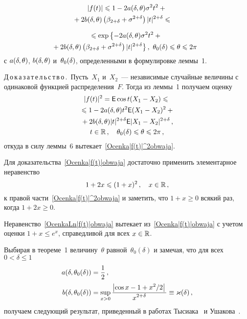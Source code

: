 \begin{multicols}{2}
\vspace*{-8pt}

\noindent
\begin{multline}
|f(t)|\leqslant1 -2a(\delta,\theta)\sigma^2t^2+{}\\
{}+2b(\delta,\theta)\left(\beta_{2+\delta}+
\sigma^{2+\delta}\right)|t|^{2+\delta}\leqslant{}\ \ \ \
\label{Ocenka|f(t)|obwaja}
\end{multline}

\vspace*{-12pt}

\noindent
\begin{multline}
\le \exp\left\{-2a(\d,\theta)\sigma^2t^2+{}\right.\\
\!\!\!\!\!\!\!\!\left.{}+2b(\d,\theta)\left(\bet+
\sigma^{2+\d}\right)|t|^{2+\d}\right\},\
\theta_0(\d)\le\theta\le2\pi \!\!\!
\label{OcenkaLn|f(t)|obwaja}
\end{multline}
с $a(\delta,\theta)$, $b(\delta,\theta)$ и~$\theta_0(\delta)$, определенными в
формулировке леммы~1.

\medskip

Д\,о\,к\,а\,з\,а\,т\,е\,л\,ь\,с\,т\,в\,о\,.\
Пусть~$X_1$ и~$X_2$~--- независимые случайные величины с одинаковой
функцией распределения~$F$. Тогда из леммы~1
получаем оценку
\begin{multline*}
|f(t)|^2={\sf E} \cos t(X_1-X_2)\leqslant{}
\\
{}\leqslant 1-2a(\delta,\theta)t^2{\sf E}(X_1-X_2)^2+{}\\
{}+ 2b(\delta,\theta)|t|^{2+\delta}{\sf E}
|X_1-X_2|^{2+\delta}\,,\\
t\in\mathbb R\,,\quad \theta_0(\delta)\leqslant\theta\leqslant2\pi\,,
\end{multline*}
откуда в силу леммы~6 вытекает~\eqref{Ocenka|f(t)|^2obwaja}.

Для доказательства~\eqref{Ocenka|f(t)|obwaja} достаточно применить
элементарное неравенство
$$
1+2x\leqslant(1+x)^2\,,\quad x\in\mathbb R\,,
$$
к правой части~\eqref{Ocenka|f(t)|^2obwaja} и заметить, что
$1+x\ge0$ всякий раз, когда $1+2x\ge0$.

Неравенство~\eqref{OcenkaLn|f(t)|obwaja} вытекает
из~\eqref{Ocenka|f(t)|obwaja} с учетом оценки ${1+x\le e^x}$,
справедливой для всех $x\in\mathbb R$.
\medskip

Выбирая в теореме~1 величину~$\theta$ равной~$\theta_0(\delta)$ и замечая, что для всех $0<\delta\le1$
\begin{align*}
a(\delta,\theta_0(\delta))&=\displaystyle\frac{\displaystyle 1\mathstrut}{\displaystyle 2\mathstrut}\,,\\
b(\delta,\theta_0(\delta))&=\sup_{x>0}\displaystyle\frac{\displaystyle \left|\cos
x-1+x^2/2\right|\mathstrut}{\displaystyle x^{2+\delta}\mathstrut}\equiv\varkappa(\delta)\,,
\end{align*}
получаем следующий результат, приведенный в работах
Тысиака~\cite{Tysiak1983} и Ушакова~\cite{Ushakov1999}.


\end{multicols}
